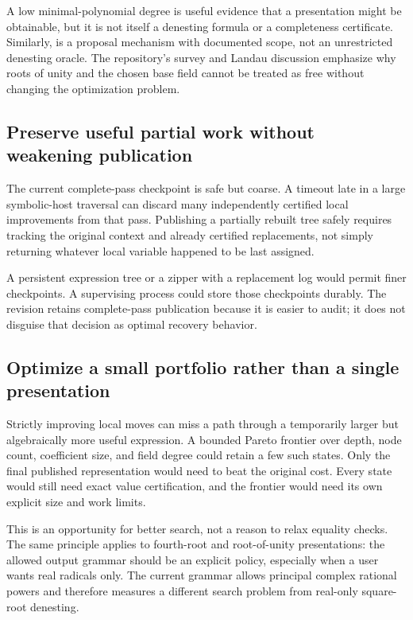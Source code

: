 \documentclass[11pt,a4paper]{article}
\newcommand{\code}[1]{\texttt{\detokenize{#1}}}
\theoremstyle{definition}\newtheorem{definition}[proposition]{Definition}
\theoremstyle{remark}\newtheorem{remark}[proposition]{Remark}
\begin{document}
A low minimal-polynomial degree is useful evidence that a presentation might
be obtainable, but it is not itself a denesting formula or a completeness
certificate. Similarly, \code{ToRadicals} is a proposal mechanism with documented
scope, not an unrestricted denesting oracle.\cite{wlradicals} The repository's
survey and Landau discussion emphasize why roots of unity and the chosen base
field cannot be treated as free without changing the optimization problem.
\cite{survey,landau}

\subsection{Preserve useful partial work without weakening publication}
The current complete-pass checkpoint is safe but coarse. A timeout late in a
large symbolic-host traversal can discard many independently certified local
improvements from that pass. Publishing a partially rebuilt tree safely requires
tracking the original context and already certified replacements, not simply
returning whatever local variable happened to be last assigned.

A persistent expression tree or a zipper with a replacement log would permit
finer checkpoints. A supervising process could store those checkpoints durably.
The revision retains complete-pass publication because it is easier to audit;
it does not disguise that decision as optimal recovery behavior.

\subsection{Optimize a small portfolio rather than a single presentation}
Strictly improving local moves can miss a path through a temporarily larger but
algebraically more useful expression. A bounded Pareto frontier over depth,
node count, coefficient size, and field degree could retain a few such states.
Only the final published representation would need to beat the original cost.
Every state would still need exact value certification, and the frontier would
need its own explicit size and work limits.

This is an opportunity for better search, not a reason to relax equality checks.
The same principle applies to fourth-root and root-of-unity presentations: the
allowed output grammar should be an explicit policy, especially when a user
wants real radicals only. The current grammar allows principal complex rational
powers and therefore measures a different search problem from real-only
square-root denesting.
\end{document}
